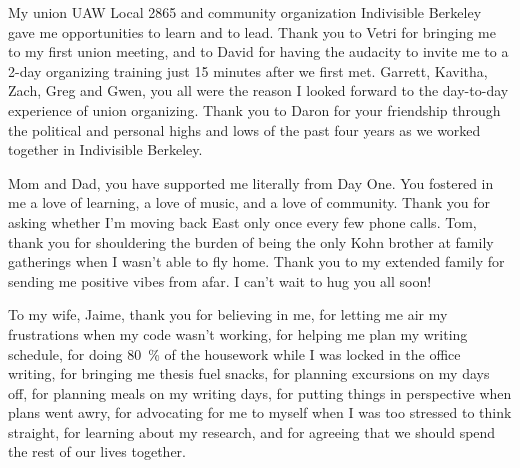 \begin{acknowledgements}
    My union UAW Local 2865 and community organization Indivisible Berkeley
    gave me opportunities to learn and to lead.
    Thank you to Vetri for bringing me to my first union meeting, and
    to David for having the audacity to invite me to a 2-day organizing training
    just 15 minutes after we first met.
    Garrett, Kavitha, Zach, Greg and Gwen, you all were the reason
    I looked forward to the day-to-day experience of union organizing.
    Thank you to Daron for your friendship through the
    political and personal highs and lows of the past four years
    as we worked together in Indivisible Berkeley.

    Mom and Dad, you have supported me literally from Day One.
    You fostered in me a love of learning, a love of music,
    and a love of community.
    Thank you for asking whether I'm moving back East only once every few phone calls.
    Tom, thank you for shouldering the burden of being the only Kohn brother
    at family gatherings when I wasn't able to fly home.
    Thank you to my extended family for sending me positive vibes from afar.
    I can't wait to hug you all soon!

    To my wife, Jaime, thank you for believing in me,
    for letting me air my frustrations when my code wasn't working,
    for helping me plan my writing schedule,
    for doing \SI{80}{\percent} of the housework while I was
    locked in the office writing,
    for bringing me thesis fuel snacks,
    for planning excursions on my days off,
    for planning meals on my writing days,
    for putting things in perspective when plans went awry,
    for advocating for me to myself when I was too stressed to think straight,
    for learning about my research,
    and for agreeing that we should spend the rest of our lives together.

\end{acknowledgements}
